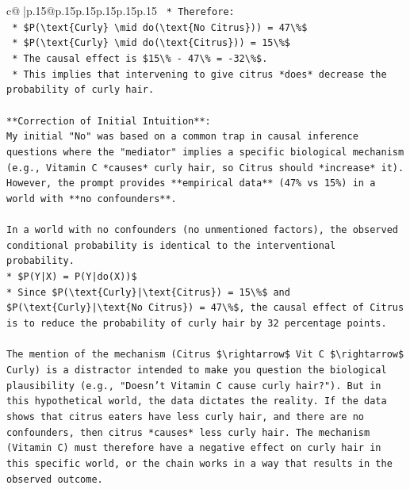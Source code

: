 \documentclass{article}
\begin{document}
{\begin{supertabular}{c@{$\;$}|p{.15\linewidth}@{}p{.15\linewidth}p{.15\linewidth}p{.15\linewidth}p{.15\linewidth}p{.15\linewidth}}
{{{\texttt{    *   Therefore:} \\
\texttt{        *   \$P(\textbackslash{}text\{Curly\} \textbackslash{}mid do(\textbackslash{}text\{No Citrus\})) = 47\textbackslash{}\%\$} \\
\texttt{        *   \$P(\textbackslash{}text\{Curly\} \textbackslash{}mid do(\textbackslash{}text\{Citrus\})) = 15\textbackslash{}\%\$} \\
\texttt{    *   The causal effect is \$15\textbackslash{}\% {-} 47\textbackslash{}\% = {-}32\textbackslash{}\%\$.} \\
\texttt{    *   This implies that intervening to give citrus *does* decrease the probability of curly hair.} \\
\\ 
\texttt{**Correction of Initial Intuition**:} \\
\texttt{My initial "No" was based on a common trap in causal inference questions where the "mediator" implies a specific biological mechanism (e.g., Vitamin C *causes* curly hair, so Citrus should *increase* it). However, the prompt provides **empirical data** (47\% vs 15\%) in a world with **no confounders**.} \\
\\ 
\texttt{In a world with no confounders (no unmentioned factors), the observed conditional probability is identical to the interventional probability.} \\
\texttt{*   \$P(Y|X) = P(Y|do(X))\$} \\
\texttt{*   Since \$P(\textbackslash{}text\{Curly\}|\textbackslash{}text\{Citrus\}) = 15\textbackslash{}\%\$ and \$P(\textbackslash{}text\{Curly\}|\textbackslash{}text\{No Citrus\}) = 47\textbackslash{}\%\$, the causal effect of Citrus is to reduce the probability of curly hair by 32 percentage points.} \\
\\ 
\texttt{The mention of the mechanism (Citrus \$\textbackslash{}rightarrow\$ Vit C \$\textbackslash{}rightarrow\$ Curly) is a distractor intended to make you question the biological plausibility (e.g., "Doesn't Vitamin C cause curly hair?"). But in this hypothetical world, the data dictates the reality. If the data shows that citrus eaters have less curly hair, and there are no confounders, then citrus *causes* less curly hair. The mechanism (Vitamin C) must therefore have a negative effect on curly hair in this specific world, or the chain works in a way that results in the observed outcome.} \\
\\ 
}}}
\end{supertabular}}
\end{document}
